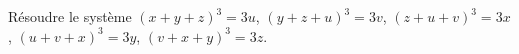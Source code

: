 Résoudre le système $(x + y + z)^3 = 3u$, $(y + z + u)^3 = 3v$, $(z + u + v)^3 = 3x$, $(u + v + x)^3 = 3y$, $(v + x + y)^3 = 3z$.
